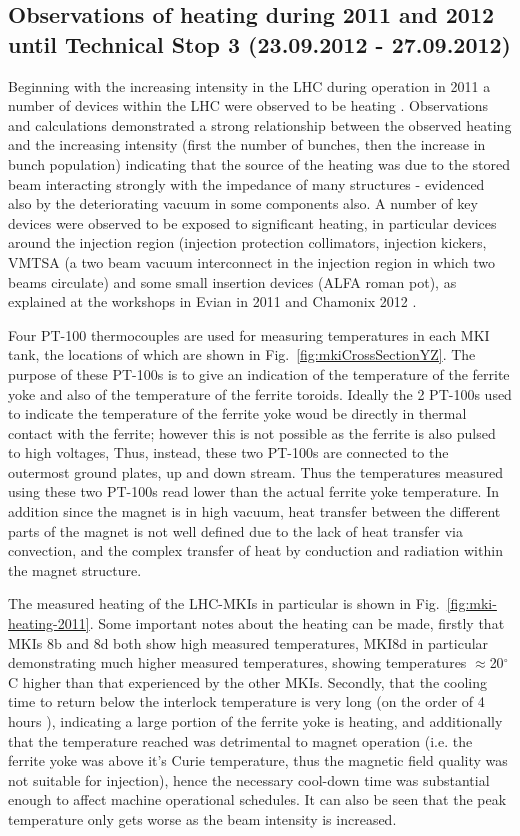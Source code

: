 \subsection{Observations of heating during 2011 and 2012 until Technical Stop 3 (23.09.2012 - 27.09.2012)}

Beginning with the increasing intensity in the LHC during operation in 2011 a number of devices within the LHC were observed to be heating \cite{ Salvant:Heating, Metral:Heating}. Observations and calculations demonstrated a strong relationship between the observed heating and the increasing intensity (first the number of bunches, then the increase in bunch population) indicating that the source of the heating was due to the stored beam interacting strongly with the impedance of many structures - evidenced also by the deteriorating vacuum in some components also. A number of key devices were observed to be exposed to significant heating, in particular devices around the injection region (injection protection collimators, injection kickers, VMTSA (a two beam vacuum interconnect in the injection region in which two beams circulate) and some small insertion devices (ALFA roman pot), as explained at the workshops in Evian in 2011 \cite{Salvant:Heating} and Chamonix 2012 \cite{Metral:Heating}. 

Four PT-100 thermocouples are used for measuring temperatures in each MKI tank, the locations of which are shown in Fig.~\ref{fig:mkiCrossSectionYZ}. The purpose of these PT-100s is to give an indication of the temperature of the ferrite yoke and also of the temperature of the ferrite toroids. Ideally the 2 PT-100s used to indicate the temperature of the ferrite yoke woud be directly in thermal contact with the ferrite; however this is not possible as the ferrite is also pulsed to high voltages, Thus, instead, these two PT-100s are connected to the outermost ground plates, up and down stream. Thus the temperatures measured using these two PT-100s read lower than the actual ferrite yoke temperature. In addition since the magnet is in high vacuum, heat transfer between the different parts of the magnet is not well defined due to the lack of heat transfer via convection, and the complex transfer of heat by conduction and radiation within the magnet structure.

The measured heating of the LHC-MKIs in particular is shown in Fig.~\ref{fig:mki-heating-2011}. Some important notes about the heating can be made, firstly that MKIs 8b and 8d both show high measured temperatures, MKI8d in particular demonstrating much higher measured temperatures, showing temperatures $\approx$20$^{\circ}$C higher than that experienced by the other MKIs. Secondly, that the cooling time to return below the interlock temperature is very long (on the order of 4 hours \cite{Goddard:timeConst}), indicating a large portion of the ferrite yoke is heating, and additionally that the temperature reached was detrimental to magnet operation (i.e. the ferrite yoke was above it's Curie temperature, thus the magnetic field quality was not suitable for injection), hence the necessary cool-down time was substantial enough to affect machine operational schedules. It can also be seen that the peak temperature only gets worse as the beam intensity is increased.

